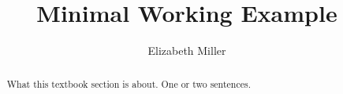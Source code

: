 \documentclass[nooutcomes]{ximera}
\author{Elizabeth Miller}
\title{Minimal Working Example}
\begin{document}
\begin{abstract}
  What this textbook section is about.  One or two sentences.
\end{abstract}
\maketitle

\end{document}
